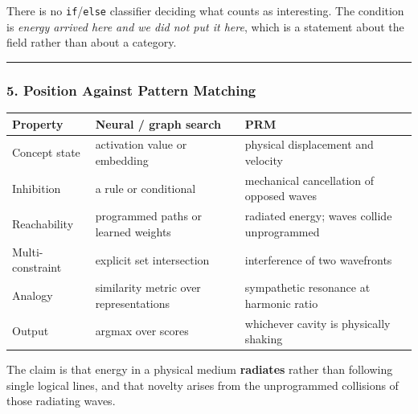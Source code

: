 \documentclass[
  11pt,
  a4paper,
]{article}
\begin{document}
There is no \texttt{if}/\texttt{else} classifier deciding what counts as
interesting. The condition is \emph{energy arrived here and we did not
put it here}, which is a statement about the field rather than about a
category.

\begin{center}\rule{0.5\linewidth}{0.5pt}\end{center}

\subsubsection{5. Position Against Pattern
Matching}\label{position-against-pattern-matching}

\begin{longtable}[]{@{}
  >{\raggedright\arraybackslash}p{}
  >{\raggedright\arraybackslash}p{}
  >{\raggedright\arraybackslash}p{}@{}}
\toprule\noalign{}
\begin{minipage}[b]{\linewidth}\raggedright
Property
\end{minipage} & \begin{minipage}[b]{\linewidth}\raggedright
Neural / graph search
\end{minipage} & \begin{minipage}[b]{\linewidth}\raggedright
PRM
\end{minipage} \\
\midrule\noalign{}
\endhead
\bottomrule\noalign{}
\endlastfoot
Concept state & activation value or embedding & physical displacement
and velocity \\
Inhibition & a rule or conditional & mechanical cancellation of opposed
waves \\
Reachability & programmed paths or learned weights & radiated energy;
waves collide unprogrammed \\
Multi-constraint & explicit set intersection & interference of two
wavefronts \\
Analogy & similarity metric over representations & sympathetic resonance
at harmonic ratio \\
Output & argmax over scores & whichever cavity is physically shaking \\
\end{longtable}

The claim is that energy in a physical medium \textbf{radiates} rather
than following single logical lines, and that novelty arises from the
unprogrammed collisions of those radiating waves.
\end{document}
